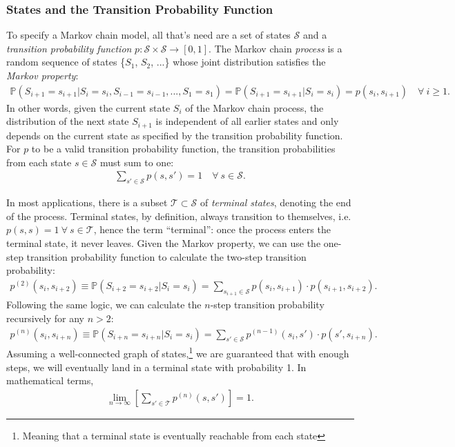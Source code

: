 \documentclass{article}
\begin{document}
    \subsubsection{\sc States and the Transition Probability Function}

    To specify a Markov chain model, all that's need are a set of states $\mathcal S$ and a {\it transition probability function} $p : \mathcal S \times \mathcal S \rightarrow [0, 1]$. The Markov chain {\it process} is a random sequence of states \{$S_1$, $S_2$, ...\} whose joint distribution satisfies the {\it Markov property}:
    \begin{align*}
      \mathbb{P}(S_{i+1} = s_{i+1} | S_i = s_i, S_{i - 1} = s_{i - 1}, ..., S_1 = s_1) = \mathbb{P}(S_{i+1} = s_{i+1} | S_i = s_i) = p(s_i, s_{i+1}) \quad \forall~i \ge 1.
    \end{align*}
    In other words, given the current state $S_i$ of the Markov chain process, the distribution of the next state $S_{i+1}$ is independent of all earlier states and only depends on the current state as specified by the transition probability function. For $p$ to be a valid transition probability function, the transition probabilities from each state $s \in \mathcal S$ must sum to one:
    \begin{align*}
      \sum_{s' \in \mathcal S} p(s, s') = 1 \quad \forall~s \in \mathcal S.
    \end{align*}

    In most applications, there is a subset $\mathcal T \subset \mathcal S$ of {\it terminal states}, denoting the end of the process. Terminal states, by definition, always transition to themselves, i.e. $p(s, s) = 1 ~\forall~s\in \mathcal T$, hence the term ``terminal'': once the process enters the terminal state, it never leaves. Given the Markov property, we can use the one-step transition probability function to calculate the two-step transition probability:
    \begin{align*}
      p^{(2)}(s_i, s_{i+2}) \equiv \mathbb{P}(S_{i+2} = s_{i+2} | S_i = s_i) = \sum_{s_{i+1} \in \mathcal S} p(s_i, s_{i+1}) \cdot p(s_{i+1}, s_{i+2}).
    \end{align*}
    Following the same logic, we can calculate the $n$-step transition probability recursively for any $n > 2$:
    \begin{align*}
      p^{(n)}(s_i, s_{i+n}) \equiv \mathbb{P}(S_{i+n} = s_{i+n} | S_i = s_i) = \sum_{s' \in \mathcal S} p^{(n-1)}(s_i, s') \cdot p(s', s_{i+n}).
    \end{align*}
    Assuming a well-connected graph of states,\footnote{Meaning that a terminal state is eventually reachable from each state} we are guaranteed that with enough steps, we will eventually land in a terminal state with probability 1. In mathematical terms,
    \begin{align*}
      \lim_{n\rightarrow\infty} \left[\sum_{s' \in \mathcal T} p^{(n)}(s, s')\right] = 1.
    \end{align*}
\end{document}
